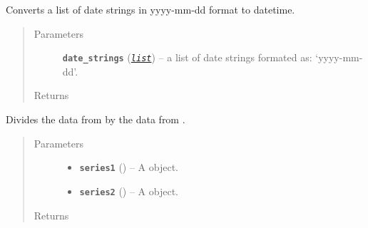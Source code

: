 \documentclass[letterpaper,10pt,english]{sphinxmanual}
\begin{document}
\begin{fulllineitems}
\label{additional_functions:fredpy.date_times}
Converts a list of date strings in yyyy-mm-dd format to datetime.
\begin{quote}\begin{description}
\item[{Parameters}] \leavevmode
\textbf{\texttt{date\_strings}} (\href{https://docs.python.org/2/library/functions.html\#list}{\emph{\texttt{list}}}) -- a list of date strings formated as: `yyyy-mm-dd'.

\item[{Returns}] \leavevmode
{}

\end{description}\end{quote}

\end{fulllineitems}


\begin{fulllineitems}
\label{additional_functions:fredpy.divide}
Divides the data from  by the data from .
\begin{quote}\begin{description}
\item[{Parameters}] \leavevmode\begin{itemize}
\item {} 
\textbf{\texttt{series1}} ({\hyperref[series_class:fredpy.series]{}}) -- A  object.

\item {} 
\textbf{\texttt{series2}} ({\hyperref[series_class:fredpy.series]{}}) -- A  object.

\end{itemize}

\item[{Returns}] \leavevmode
{\hyperref[series_class:fredpy.series]{}}

\end{description}\end{quote}

\end{fulllineitems}
\end{document}
